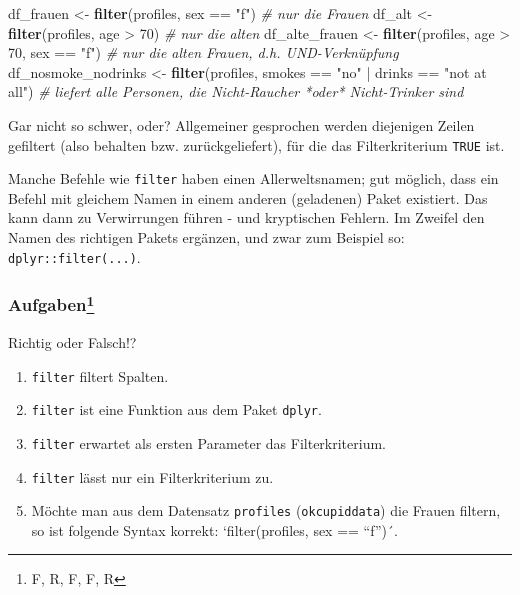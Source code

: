 \documentclass[12pt,ngerman,]{book}
\newenvironment{Shaded}{\begin{snugshade}}{\end{snugshade}}
\newcommand{\KeywordTok}[1]{\textcolor[rgb]{0.13,0.29,0.53}{\textbf{{#1}}}}
\newcommand{\DecValTok}[1]{\textcolor[rgb]{0.00,0.00,0.81}{{#1}}}
\newcommand{\StringTok}[1]{\textcolor[rgb]{0.31,0.60,0.02}{{#1}}}
\newcommand{\CommentTok}[1]{\textcolor[rgb]{0.56,0.35,0.01}{\textit{{#1}}}}
\newcommand{\NormalTok}[1]{{#1}}
\providecommand{\tightlist}{%
  \setlength{\itemsep}{0pt}\setlength{\parskip}{0pt}}
\let\rmarkdownfootnote\footnote%
\def\footnote{\protect\rmarkdownfootnote}
\renewenvironment{Shaded}{\begin{kframe}}{\end{kframe}}
\let\BeginKnitrBlock\begin \let\EndKnitrBlock\end
\begin{document}
\begin{Shaded}
\begin{Highlighting}[]
\NormalTok{df_frauen <-}\StringTok{ }\KeywordTok{filter}\NormalTok{(profiles, sex ==}\StringTok{ "f"}\NormalTok{)  }\CommentTok{# nur die Frauen}
\NormalTok{df_alt <-}\StringTok{ }\KeywordTok{filter}\NormalTok{(profiles, age >}\StringTok{ }\DecValTok{70}\NormalTok{)  }\CommentTok{# nur die alten}
\NormalTok{df_alte_frauen <-}\StringTok{ }\KeywordTok{filter}\NormalTok{(profiles, age >}\StringTok{ }\DecValTok{70}\NormalTok{, sex ==}\StringTok{ "f"}\NormalTok{)  }\CommentTok{# nur die alten Frauen, d.h. UND-Verknüpfung}
\NormalTok{df_nosmoke_nodrinks <-}\StringTok{ }\KeywordTok{filter}\NormalTok{(profiles, smokes ==}\StringTok{ "no"} \NormalTok{|}\StringTok{ }\NormalTok{drinks ==}\StringTok{ "not at all"}\NormalTok{) }
\CommentTok{# liefert alle Personen, die Nicht-Raucher *oder* Nicht-Trinker sind}
\end{Highlighting}
\end{Shaded}

Gar nicht so schwer, oder? Allgemeiner gesprochen werden diejenigen
Zeilen gefiltert (also behalten bzw. zurückgeliefert), für die das
Filterkriterium \texttt{TRUE} ist.

\BeginKnitrBlock{rmdcaution}
Manche Befehle wie \texttt{filter} haben einen Allerweltsnamen; gut
möglich, dass ein Befehl mit gleichem Namen in einem anderen (geladenen)
Paket existiert. Das kann dann zu Verwirrungen führen - und kryptischen
Fehlern. Im Zweifel den Namen des richtigen Pakets ergänzen, und zwar
zum Beispiel so: \texttt{dplyr::filter(...)}.
\EndKnitrBlock{rmdcaution}

\subsubsection[Aufgaben]{\texorpdfstring{Aufgaben\footnote{F, R, F, F, R}}{Aufgaben}}\label{aufgaben}

\BeginKnitrBlock{rmdexercises}
Richtig oder Falsch!?

\begin{enumerate}
\def\labelenumi{\arabic{enumi}.}
\tightlist
\item
  \texttt{filter} filtert Spalten.
\item
  \texttt{filter} ist eine Funktion aus dem Paket \texttt{dplyr}.
\item
  \texttt{filter} erwartet als ersten Parameter das Filterkriterium.
\item
  \texttt{filter} lässt nur ein Filterkriterium zu.
\item
  Möchte man aus dem Datensatz \texttt{profiles} (\texttt{okcupiddata})
  die Frauen filtern, so ist folgende Syntax korrekt: `filter(profiles,
  sex == ``f'')´.
\end{enumerate}
\EndKnitrBlock{rmdexercises}
\end{document}
